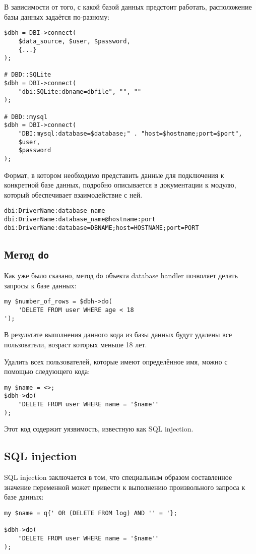 В зависимости от того, с какой базой данных предстоит работать, расположение базы данных задаётся по-разному:
\begin{verbatim}
$dbh = DBI->connect(
    $data_source, $user, $password,
    {...}
);

# DBD::SQLite
$dbh = DBI->connect(
    "dbi:SQLite:dbname=dbfile", "", ""
);

# DBD::mysql
$dbh = DBI->connect(
    "DBI:mysql:database=$database;" . "host=$hostname;port=$port",
    $user,
    $password
);
\end{verbatim}
Формат, в котором необходимо представить данные для подключения к конкретной базе данных, подробно описывается в документации к модулю, который обеспечивает взаимодействие с ней.
\begin{verbatim}
dbi:DriverName:database_name
dbi:DriverName:database_name@hostname:port
dbi:DriverName:database=DBNAME;host=HOSTNAME;port=PORT
\end{verbatim}

\subsection{Метод \texttt{do}}
Как уже было сказано, метод \verb|do| объекта database handler позволяет делать запросы к базе данных:
\begin{verbatim}
my $number_of_rows = $dbh->do(
    'DELETE FROM user WHERE age < 18
');
\end{verbatim}
В результате выполнения данного кода из базы данных будут удалены все пользователи, возраст которых меньше 18 лет.

Удалить всех пользователей, которые имеют определённое имя, можно с помощью следующего кода:
\begin{verbatim}
my $name = <>;
$dbh->do(
    "DELETE FROM user WHERE name = '$name'"
);
\end{verbatim}
Этот код содержит уязвимость, известную как SQL injection.

\subsection{SQL injection}
SQL injection заключается в том, что специальным образом составленное значение переменной может привести к выполнению произвольного запроса к базе данных:
\begin{verbatim}
my $name = q{' OR (DELETE FROM log) AND '' = '};

$dbh->do(
    "DELETE FROM user WHERE name = '$name'"
);
\end{verbatim}

